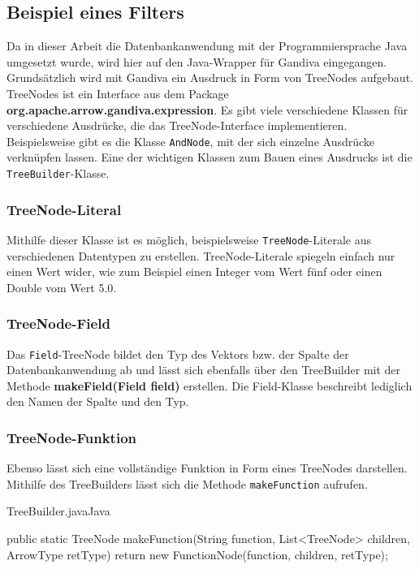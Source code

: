 \newpage

\subsection{Beispiel eines Filters}
\label{Beispiel eines Filters}

Da in dieser Arbeit die Datenbankanwendung mit der Programmiersprache Java umgesetzt wurde, wird hier auf den Java-Wrapper für Gandiva eingegangen.\\
Grundsätzlich wird mit Gandiva ein Ausdruck in Form von TreeNodes aufgebaut. TreeNodes ist ein Interface aus dem Package \textbf{org.apache.arrow.gandiva.expression}. Es gibt viele verschiedene Klassen für verschiedene Ausdrücke, die das TreeNode-Interface implementieren. 
Beispielsweise gibt es die Klasse \texttt{AndNode}, mit der sich einzelne Ausdrücke verknüpfen lassen.
Eine der wichtigen Klassen zum Bauen eines Ausdrucks ist die \texttt{TreeBuilder}-Klasse.

\subsubsection{TreeNode-Literal}
Mithilfe dieser Klasse ist es möglich, beispielsweise \texttt{TreeNode}-Literale aus verschiedenen Datentypen zu erstellen. TreeNode-Literale spiegeln einfach nur einen Wert wider, wie zum Beispiel einen Integer vom Wert fünf oder einen Double vom Wert 5.0. \\

\subsubsection{TreeNode-Field}
Das \texttt{Field}-TreeNode bildet den Typ des Vektors bzw. der Spalte der Datenbankanwendung ab und lässt sich ebenfalls über den TreeBuilder mit der Methode \textbf{makeField(Field field)} erstellen.
Die Field-Klasse beschreibt lediglich den Namen der Spalte und den Typ.

\subsubsection{TreeNode-Funktion}
\label{TreeNode-Funktion}
Ebenso lässt sich eine vollständige Funktion in Form eines TreeNodes darstellen.
Mithilfe des TreeBuilders lässt sich die Methode \texttt{makeFunction} aufrufen.

\begin{codeblock}{TreeBuilder.java}{Java}
  \begin{javacode}
    public static TreeNode makeFunction(String function, List<TreeNode> children, ArrowType retType) {
        return new FunctionNode(function, children, retType);
    }
  \end{javacode}
\end{codeblock}

